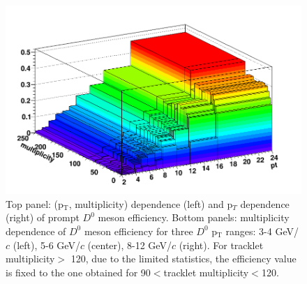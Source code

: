 \begin{figure}[!htp]
	\includegraphics[width=.48\linewidth]{figures/Effs/EfficiencyMap_2D_Dzero_c_Ref_wLimAcc_Plot.png} 
\caption{Top panel: (p$_\mathrm{T}$, multiplicity) dependence (left) and p$_T$ dependence (right) of prompt $D^0$ meson efficiency. Bottom panels: multiplicity dependence of $D^0$ meson efficiency for three $D^0$ p$_\mathrm{T}$ ranges: 3-4 GeV/$c$ (left), 5-6 GeV/$c$ (center), 8-12 GeV/$c$ (right). For tracklet multiplicity$>$ 120, due to the limited statistics, the efficiency value is fixed to the one obtained for 90$<$tracklet multiplicity$<$120.}
	\label{fig:d0eff}	
\end{figure}

